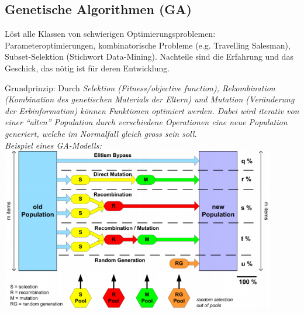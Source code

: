 \subsection{Genetische Algorithmen (GA) }
  \begin{minipage}{12cm}
    Löst alle Klassen von schwierigen Optimierungsproblemen: Parameteroptimierungen, kombinatorische Probleme (e.g. Travelling Salesman), Subset-Selektion (Stichwort Data-Mining). Nachteile sind die Erfahrung und das Geschick, das nötig ist für deren Entwicklung.
  
    Grundprinzip: Durch \em Selektion \em (Fitness/objective function), \em Rekombination \em (Kombination des genetischen Materials der Eltern) und \em Mutation \em (Veränderung der Erbinformation) können Funktionen optimiert werden. Dabei wird iterativ von einer "`alten"' Population durch verschiedene Operationen eine neue Population generiert, welche im Normalfall gleich gross sein soll.\\
    
    Beispiel eines GA-Modells:\\
    \includegraphics[width=12cm]{./Content/MetaHeuristics/GeneticAlgorithms_Model}
  \end{minipage}
